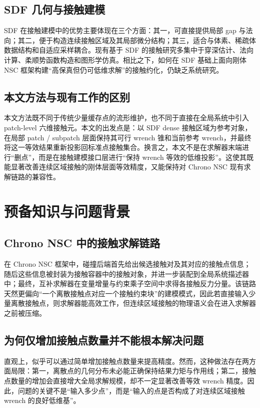 \documentclass[UTF8,a4paper,11pt]{ctexart}
\begin{document}
\subsection{SDF 几何与接触建模}

SDF 在接触建模中的优势主要体现在三个方面：其一，可直接提供局部 gap 与法向；其二，便于构造连续接触区域及其局部微分结构；其三，适合与体素、稀疏体数据结构和自适应采样耦合。现有基于 SDF 的接触研究多集中于穿深估计、法向计算、柔顺势函数构造和图形学仿真。相比之下，如何在 SDF 基础上面向刚体 NSC 框架构建“高保真但仍可低维求解”的接触约化，仍缺乏系统研究。

\subsection{本文方法与现有工作的区别}

本文方法既不同于传统少量缓存点的流形维护，也不同于直接在全局系统中引入 patch-level 六维接触元。本文的出发点是：以 SDF dense 接触区域为参考对象，在局部 patch / subpatch 层面保持其可行 wrench 锥和当前参考 wrench，并最终将这一等效结果重新投影回标准点接触集合。换言之，本文不是在求解器末端进行“删点”，而是在接触建模接口层进行“保持 wrench 等效的低维投影”。这使其既能显著改善连续区域接触的刚体层面等效精度，又能保持对 Chrono NSC 现有求解链路的兼容性。

\section{预备知识与问题背景}
\label{sec:preliminaries}

\subsection{Chrono NSC 中的接触求解链路}

在 Chrono NSC 框架中，碰撞后端首先给出候选接触对及其对应的接触点信息；随后这些信息被封装为接触容器中的接触对象，并进一步装配到全局系统描述器中；最终，互补求解器在变量增量与约束乘子空间中求得各接触反力分量。该链路天然更偏向“一个离散接触点对应一个接触约束块”的建模模式，因此若直接输入少量离散接触点，则求解器能高效工作，但连续区域接触的物理语义会在进入求解器之前被压缩。

\subsection{为何仅增加接触点数量并不能根本解决问题}

直观上，似乎可以通过简单增加接触点数量来提高精度。然而，这种做法存在两方面局限：第一，离散点的几何分布未必能正确保持结果力矩与作用线；第二，接触点数量的增加会直接增大全局求解规模，却不一定显著改善等效 wrench 精度。因此，问题的关键不是“输入多少点”，而是“输入的点是否构成了对连续区域接触 wrench 的良好低维基”。
\end{document}
